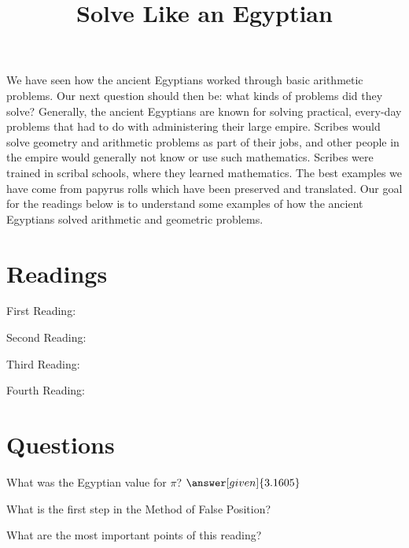 \documentclass{ximera}
\title{Solve Like an Egyptian}
\begin{document}
\begin{abstract}
\end{abstract}
\maketitle



We have seen how the ancient Egyptians worked through basic arithmetic problems.  Our next question should then be: what kinds of problems did they solve?  Generally, the ancient Egyptians are known for solving practical, every-day problems that had to do with administering their large empire.  Scribes would solve geometry and arithmetic problems as part of their jobs, and other people in the empire would generally not know or use such mathematics.  Scribes were trained in scribal schools, where they learned mathematics.  The best examples we have come from papyrus rolls which have been preserved and translated.  Our goal for the readings below is to understand some examples of how the ancient Egyptians solved arithmetic and geometric problems.



\section{Readings}

First Reading: 

Second Reading: 

Third Reading: 

Fourth Reading: 


\section{Questions}

\begin{question}
What was the Egyptian value for $\pi$? $\answer[given]{3.1605}$
\end{question}

\begin{question}
What is the first step in the Method of False Position?
\begin{multipleChoice}
\end{multipleChoice}
\end{question}


\begin{question}
What are the most important points of this reading?
\begin{freeResponse}
\end{freeResponse}
\end{question}
\end{document}
